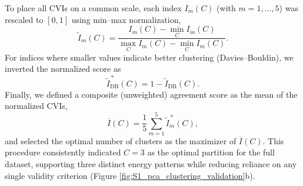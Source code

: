 \documentclass[pdflatex,sn-chicago]{sn-jnl}%
\theoremstyle{plain}
\theoremstyle{definition}
\theoremstyle{remark}
\theoremstyle{definition}
\begin{document}
To place all CVIs on a common scale, each index $I_m(C)$ (with $m=1,\ldots,5$) was rescaled to $[0,1]$ using min--max normalization,
\begin{equation}
\widetilde{I}_m(C) = \frac{I_m(C) - \min\limits_{C} I_m(C)}{\max\limits_{C} I_m(C) - \min\limits_{C} I_m(C)}.
\end{equation}
For indices where smaller values indicate better clustering (Davies--Bouldin), we inverted the normalized score as
\begin{equation}
\widetilde{I}_{\mathrm{DB}}^{\,*}(C) = 1 - \widetilde{I}_{\mathrm{DB}}(C).
\end{equation}
Finally, we defined a composite (unweighted) agreement score as the mean of the normalized CVIs,
\begin{equation}
\overline{I}(C) = \frac{1}{5}\sum_{m=1}^{5}\widetilde{I}_m^{\,*}(C),
\end{equation}
and selected the optimal number of clusters as the maximizer of $\overline{I}(C)$. This procedure consistently indicated $C=3$ as the optimal partition for the full dataset, supporting three distinct energy patterns while reducing reliance on any single validity criterion  (Figure \ref{fig:S1_pca_clustering_validation}b). 
\end{document}

